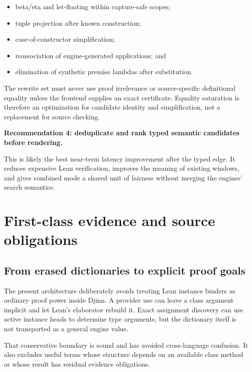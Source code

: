 \documentclass[11pt]{article}
\newcommand{\Djinn}{Djinn}
\newenvironment{recommendation}[1]
{\par\medskip\noindent\colorbox{GoodBg}{\parbox{\dimexpr\linewidth-2\fboxsep\relax}{\sffamily\bfseries #1}}\par\smallskip}
{\par\medskip}
\begin{document}
\begin{itemize}
  \item beta/eta and let-floating within capture-safe scopes;
  \item tuple projection after known construction;
  \item case-of-constructor simplification;
  \item reassociation of engine-generated applications; and
  \item elimination of synthetic premise lambdas after substitution.
\end{itemize}

The rewrite set must never use proof irrelevance or source-specific definitional
equality unless the frontend supplies an exact certificate.  Equality
saturation is therefore an optimization for candidate identity and simplification,
not a replacement for source checking.

\begin{recommendation}{Recommendation 4: deduplicate and rank typed semantic candidates before rendering.}
This is likely the best near-term latency improvement after the typed edge.  It
reduces expensive Lean verification, improves the meaning of existing windows,
and gives combined mode a shared unit of fairness without merging the engines'
search semantics.
\end{recommendation}

\section{First-class evidence and source obligations}
\label{sec:obligations}

\subsection{From erased dictionaries to explicit proof goals}

The present architecture deliberately avoids treating Lean instance binders as
ordinary proof power inside \Djinn{}.  A provider use can leave a class argument
implicit and let Lean's elaborator rebuild it.  Exact assignment discovery can
use active instance heads to determine type arguments, but the dictionary
itself is not transported as a general engine value.

That conservative boundary is sound and has avoided cross-language confusion.
It also excludes useful terms whose structure depends on an available class
method or whose result has residual evidence obligations.
\end{document}
